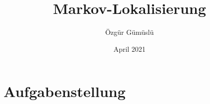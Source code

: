 \documentclass[12pt]{article}
\title{Markov-Lokalisierung}
\author{Özgür Gümüslü}
\date{April 2021}
\begin{document}
\maketitle
\tableofcontents
\newpage

\section{Aufgabenstellung}
\end{document}
